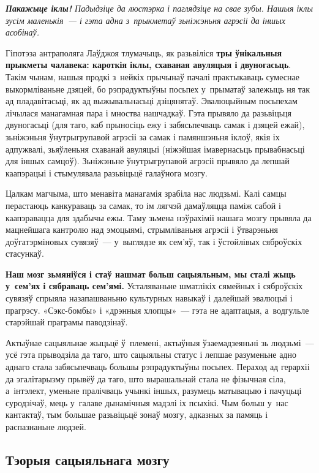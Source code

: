 \emph{\textbf{Пакажыце іклы!} Падыдзіце да люстэрка і паглядзіце на свае зубы. Нашыя іклы зусім маленькія~--- і гэта адна з~прыкметаў зьніжэньня агрэсіі да іншых асобінаў.}

Гіпотэза антраполяга Лаўджоя тлумачыць, як разьвіліся \textbf{тры ўнікальныя прыкметы чалавека: кароткія іклы, схаваная авуляцыя і двуногасьць}. Такім чынам, нашыя продкі з~нейкіх прычынаў пачалі практыкаваць сумеснае выкормліваньне дзяцей, бо рэпрадуктыўны посьпех у~прыматаў залежыць ня так ад пладавітасьці, як ад выжывальнасьці дзіцянятаў. Эвалюцыйным посьпехам лічылася манагамная пара і мноства нашчадкаў. Гэта прывяло да разьвіцьця двуногасьці (для таго, каб прыносіць ежу і забясьпечваць самак і дзяцей ежай), зьніжэньня ўнутрыгрупавой агрэсіі за самак і памяншэньня іклоў, якія іх адпужвалі, зьяўленьня схаванай авуляцыі (ніжэйшая імавернасьць прывабнасьці для іншых самцоў). Зьніжэньне ўнутрыгрупавой агрэсіі прывяло да лепшай каапэрацыі і стымулявала разьвіцьцё галаўнога мозгу.

Цалкам магчыма, што менавіта манагамія зрабіла нас людзьмі. Калі самцы перастаюць канкураваць за самак, то ім лягчэй дамаўляцца паміж сабой і каапэравацца для здабычы ежы. Таму зьмена нэўрахіміі нашага мозгу прывяла да мацнейшага кантролю над эмоцыямі, стрымліваньня агрэсіі і ўтварэньня доўгатэрміновых сувязяў~--- у~выглядзе як сем'яў, так і ўстойлівых сяброўскіх стасункаў.

\textbf{Наш мозг зьмяніўся і стаў нашмат больш сацыяльным, мы сталі жыць у~сем'ях і сябраваць сем'ямі.} Усталяваньне шматлікіх сямейных і сяброўскіх сувязяў спрыяла назапашваньню культурных навыкаў і далейшай эвалюцыі і прагрэсу. «Сэкс-бомбы» і «дрэнныя хлопцы»~--- гэта не адаптацыя, а~водгульле старэйшай праграмы паводзінаў.

Актыўнае сацыяльнае жыцьцё ў~племені, актыўныя ўзаемадзеяньні зь людзьмі~--- усё гэта прыводзіла да таго, што сацыяльны статус і лепшае разуменьне адно аднаго стала забясьпечваць большы рэпрадуктыўны посьпех. Пераход ад герархіі да эгалітарызму прывёў да таго, што вырашальнай стала не фізычная сіла, а~інтэлект, уменьне пралічваць учынкі іншых, разумець матывацыю і пачуцьці суродзічаў, мець у~галаве дынамічныя мадэлі іх псыхікі. Чым больш у~нас кантактаў, тым большае разьвіцьцё зонаў мозгу, адказных за памяць і распазнаньне людзей.

\subsection*{Тэорыя сацыяльнага мозгу}

